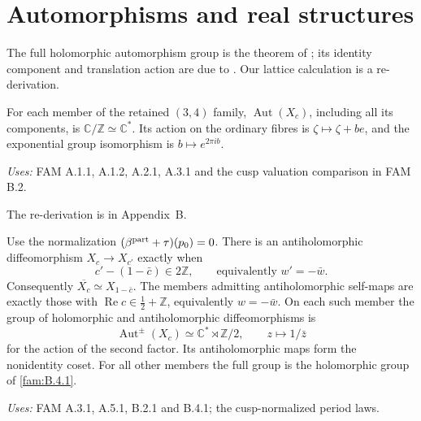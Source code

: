 \section{Automorphisms and real structures}
\label{sec:real}
The full holomorphic automorphism group is the theorem of
\cite[theorem \texttt{p2:thm:full-automorphisms}]{DGKXv1}; its identity
component and translation action are due to \cite[\S9.7, Proposition~9.23
and Corollary~9.24]{AC26}. Our lattice calculation is a re-derivation.
\begin{cited}[FAM B.4.1; K]\label{fam:B.4.1}
For each member of the retained $(3,4)$ family, $\operatorname{Aut}(X_c)$, including all its components, is $\mathbb C/\mathbb Z\simeq\mathbb C^*$. Its action on the ordinary fibres is $\zeta\mapsto\zeta+be$, and the exponential group isomorphism is $b\mapsto e^{2\pi ib}$.
\end{cited}
\noindent\emph{Uses:} FAM A.1.1, A.1.2, A.2.1, A.3.1 and the cusp valuation comparison in FAM B.2.\par
\noindent The re-derivation is in Appendix~B.\par

\begin{proposition}[FAM B.4.2; T]\label{fam:B.4.2}
Use the normalization $(\beta^{\rm part}+\tau)(p_0)=0$. There is an antiholomorphic diffeomorphism $X_c\to X_{c'}$ exactly when
\[
 c'-(1-\bar c)\in2\mathbb Z,
 \qquad\text{equivalently }w'=-\bar w.
\]
Consequently $\overline{X_c}\simeq X_{1-\bar c}$. The members admitting antiholomorphic self-maps are exactly those with $\operatorname{Re}c\in\tfrac12+\mathbb Z$, equivalently $w=-\bar w$. On each such member the group of holomorphic and antiholomorphic diffeomorphisms is
\[
 \operatorname{Aut}^{\pm}(X_c)\simeq\mathbb C^*\rtimes\mathbb Z/2,
 \qquad z\longmapsto1/\bar z
\]
for the action of the second factor. Its antiholomorphic maps form the nonidentity coset. For all other members the full group is the holomorphic group of \ref{fam:B.4.1}.
\end{proposition}
\noindent\emph{Uses:} FAM A.3.1, A.5.1, B.2.1 and B.4.1; the cusp-normalized period laws.\par

